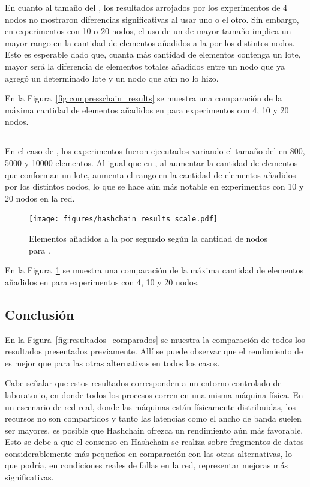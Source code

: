 En cuanto al tamaño del \collector, los resultados arrojados por los experimentos de 4 nodos no mostraron diferencias significativas
al usar uno o el otro.
Sin embargo, en experimentos con 10 o 20 nodos, el uso de un \collector de mayor tamaño implica un mayor rango en la cantidad
de elementos añadidos a la \setchain por los distintos nodos.
Esto es esperable dado que, cuanta más cantidad de elementos contenga un lote, mayor será la diferencia de elementos totales añadidos
entre un nodo que ya agregó un determinado lote y un nodo que aún no lo hizo.

En la Figura~\ref{fig:compresschain_results} se muestra una comparación de la máxima cantidad de elementos añadidos en \compresschain para experimentos con
4, 10 y 20 nodos.


\subsection{\hashchain}

En el caso de \hashchain, los experimentos fueron ejecutados variando el tamaño del \collector en 800, 5000 y 10000 elementos.
Al igual que en \compresschain, al aumentar la cantidad de elementos que conforman un lote, aumenta el rango en la cantidad
de elementos añadidos por los distintos nodos, lo que se hace aún más notable en experimentos con 10 y 20 nodos en la red.

\begin{figure}
	\centering
	\texttt{[image: figures/hashchain\_results\_scale.pdf]}
	\caption{Elementos añadidos a la \setchain por segundo según la cantidad de nodos para \hashchain.}
	\label{fig:hashchain_results}
\end{figure}

En la Figura~\ref{fig:hashchain_results} se muestra una comparación de la máxima cantidad de elementos añadidos en \hashchain para experimentos con
4, 10 y 20 nodos.


\subsection{Conclusión}
En la Figura~\ref{fig:resultados_comparados} se muestra la comparación de todos los resultados presentados previamente.
Allí se puede observar que el rendimiento de \hashchain es mejor que para las otras alternativas en todos los casos. 

Cabe señalar que estos resultados corresponden a un entorno controlado de laboratorio, en donde
todos los procesos corren en una misma máquina física.
En un escenario de red real, donde las máquinas están físicamente distribuidas, los recursos no son compartidos y tanto las
latencias como el ancho de banda suelen ser mayores, es posible que Hashchain ofrezca un
rendimiento aún más favorable.
Esto se debe a que el consenso en Hashchain se realiza sobre fragmentos de datos considerablemente más
pequeños en comparación con las otras alternativas, lo que podría, en condiciones reales de fallas en la red,
representar mejoras más significativas. 


